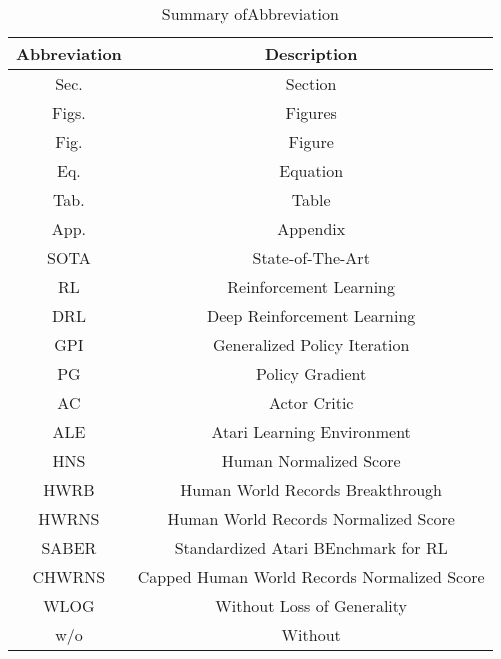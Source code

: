 \begin{table}[!hb]
	\centering
	\caption{Summary ofAbbreviation}
	\label{tab: abbreviation}
	\begin{tabular}{|c| c|}
		\hline
		\textbf{Abbreviation} &\textbf{Description}\\
		\hline
		Sec.  & Section \citep{agent57} \\
		\hline
		Figs. & Figures \citep{dreamerv2} \\
		\hline
		Fig. & Figure \citep{agent57} \\
		\hline
		Eq.     & Equation \citep{agent57}\\
		\hline
		Tab.    & Table \citep{agent57} \\
		\hline
		App.    & Appendix \citep{agent57} \\
		\hline
		SOTA & State-of-The-Art \citep{agent57}    \\
		\hline
		RL  & Reinforcement Learning \citep{sutton} \\
		\hline
		DRL & Deep Reinforcement Learning \citep{sutton} \\
        \hline
        GPI & Generalized Policy Iteration \citep{sutton} \\
        \hline
        PG  & Policy Gradient \citep{sutton} \\
        \hline
        AC  & Actor Critic \citep{sutton} \\
        \hline
        ALE & Atari Learning Environment \citep{ale} \\
        \hline
        HNS   & Human Normalized Score \citep{ale} \\
        \hline
        HWRB & Human World Records Breakthrough \\
        \hline
        HWRNS & Human World Records Normalized Score \\
        \hline
        SABER & Standardized Atari BEnchmark for RL \citep{atarihuman}\\
        \hline
        CHWRNS & Capped Human World Records Normalized Score \\      
        \hline
        WLOG   & Without Loss of Generality \\
        \hline
        w/o    & Without \\
		\hline
	\end{tabular} 
\end{table}



